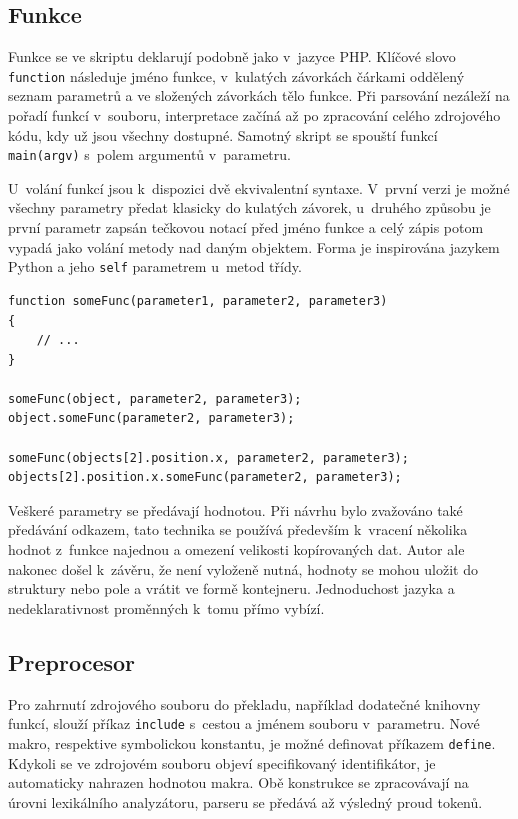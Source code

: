 \documentclass[11pt,twoside,a4paper]{book}
\begin{document}
\subsection{Funkce}

Funkce se ve skriptu deklarují podobně jako v~jazyce PHP. Klíčové slovo \texttt{function} následuje jméno funkce, v~kulatých závorkách čárkami oddělený seznam parametrů a ve složených závorkách tělo funkce. Při parsování nezáleží na pořadí funkcí v~souboru, interpretace začíná až po zpracování celého zdrojového kódu, kdy už jsou všechny dostupné. Samotný skript se spouští funkcí \texttt{main(argv)} s~polem argumentů v~parametru.

U~volání funkcí jsou k~dispozici dvě ekvivalentní syntaxe. V~první verzi je možné všechny parametry předat klasicky do kulatých závorek, u~druhého způsobu je první parametr zapsán tečkovou notací před jméno funkce a celý zápis potom vypadá jako volání metody nad daným objektem. Forma je inspirována jazykem Python a jeho \texttt{self} parametrem u~metod třídy.

\begin{verbatim}
function someFunc(parameter1, parameter2, parameter3)
{
    // ...
}

someFunc(object, parameter2, parameter3);
object.someFunc(parameter2, parameter3);

someFunc(objects[2].position.x, parameter2, parameter3);
objects[2].position.x.someFunc(parameter2, parameter3);
\end{verbatim}

Veškeré parametry se předávají hodnotou. Při návrhu bylo zvažováno také předávání odkazem, tato technika se používá především k~vracení několika hodnot z~funkce najednou a omezení velikosti kopírovaných dat. Autor ale nakonec došel k~závěru, že není vyloženě nutná, hodnoty se mohou uložit do struktury nebo pole a vrátit ve formě kontejneru. Jednoduchost jazyka a nedeklarativnost proměnných k~tomu přímo vybízí.


\subsection{Preprocesor}
\label{preprocesor}

Pro zahrnutí zdrojového souboru do překladu, například dodatečné knihovny funkcí, slouží příkaz \texttt{include} s~cestou a jménem souboru v~parametru. Nové makro, respektive symbolickou konstantu, je možné definovat příkazem \texttt{define}. Kdykoli se ve zdrojovém souboru objeví specifikovaný identifikátor, je automaticky nahrazen hodnotou makra. Obě konstrukce se zpracovávají na úrovni lexikálního analyzátoru, parseru se předává až výsledný proud tokenů.
\end{document}
